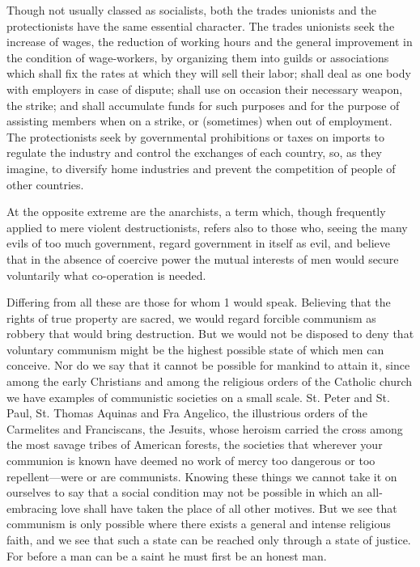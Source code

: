 \documentclass{book}
\begin{document}
Though not usually classed as socialists, both the trades unionists and the protectionists have the same essential character. The trades unionists seek the increase of wages, the reduction of working hours and the general improvement in the condition of wage-workers, by organizing them into guilds or associations which shall fix the rates at which they will sell their labor; shall deal as one body with employers in case of dispute; shall use on occasion their necessary weapon, the strike; and shall accumulate funds for such purposes and for the purpose of assisting members when on a strike, or (sometimes) when out of employment. The protectionists seek by governmental prohibitions or taxes on imports to regulate the industry and control the exchanges of each country, so, as they imagine, to diversify home industries and prevent the competition of people of other countries.

At the opposite extreme are the anarchists, a term which, though frequently applied to mere violent destructionists, refers also to those who, seeing the many evils of too much government, regard government in itself as evil, and believe that in the absence of coercive power the mutual interests of men would secure voluntarily what co-operation is needed.

Differing from all these are those for whom 1 would speak. Believing that the rights of true property are sacred, we would regard forcible communism as robbery that would bring destruction. But we would not be disposed to deny that voluntary communism might be the highest possible state of which men can conceive. Nor do we say that it cannot be possible for mankind to attain it, since among the early Christians and among the religious orders of the Catholic church we have examples of communistic societies on a small scale. St. Peter and St. Paul, St. Thomas Aquinas and Fra Angelico, the illustrious orders of the Carmelites and Franciscans, the Jesuits, whose heroism carried the cross among the most savage tribes of American forests, the societies that wherever your communion is known have deemed no work of mercy too dangerous or too repellent—were or are communists. Knowing these things we cannot take it on ourselves to say that a social condition may not be possible in which an all-embracing love shall have taken the place of all other motives. But we see that communism is only possible where there exists a general and intense religious faith, and we see that such a state can be reached only through a state of justice. For before a man can be a saint he must first be an honest man.
\end{document}
